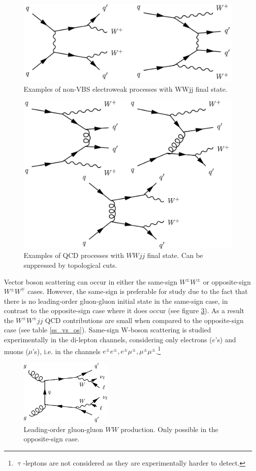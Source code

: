 \begin{figure}
\centering
  \centering
  \includegraphics[width=.75\textwidth]{images/ssWW/ewk_bkg.png}
  \caption{Examples of non-VBS electroweak processes with WWjj final state.}
  \label{ewk_bkg}
\end{figure}
\begin{figure}
  \centering
  \includegraphics[width=.75\textwidth]{images/ssWW/qcd_bkg.png}
  \caption{Examples of QCD processes with $WWjj$ final state. Can be suppressed by topological cuts.}
  \label{qcd_bkg}
\end{figure}

Vector boson scattering can occur in either the same-sign $W^{\pm}W^{\pm}$ or opposite-sign $W^{\pm}W^{\mp}$ cases. However, the same-sign is preferable for study due to the fact that there is no leading-order gluon-gluon initial state in the same-sign case, in contrast to the opposite-sign case where it does occur (see figure \ref{LO_gluon-gluon}). As a result the $W^{\pm}W^{\pm}jj$ QCD contributions are small when compared to the opposite-sign case (see table \ref{ss_vs_os}). Same-sign W-boson scattering is studied experimentally in the di-lepton channels, considering only electrons ($e$'s) and muons ($\mu$'s), i.e. in the channels $e^{\pm}e^{\pm},e^{\pm}\mu^{\pm},\mu^{\pm}\mu^{\pm}$.\footnote{$\uptau$-leptons are not considered as they are experimentally harder to detect.}

\begin{figure}
\centering
\includegraphics[width=0.4\textwidth]{images/ssWW/LO_gluon-gluon.png}
\caption{Leading-order gluon-gluon $WW$ production. Only possible in the opposite-sign case.}
\label{LO_gluon-gluon}
\end{figure}


